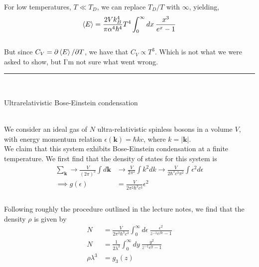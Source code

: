 \documentclass[]{article}
\begin{document}
\begin{enumerate}[1.]
For low temperatures, $T \ll T_D$, we can replace $T_D/T$ with $\infty$, yielding, \\

\begin{equation}
\begin{aligned}
\expval{E} & =  \frac{ 2 V k_B^4}{ \pi \alpha^4 \hbar^4 }  T^4 \int_{0}^{\infty} dx \: \frac{  x^3 }{ e^{ x} - 1 }  \\
%
\end{aligned}
\end{equation} \\

But since $C_V = \partial \expval{E} /\partial T$, we have that $C_V \propto T^3$. Which is not what we were asked to show, but I'm not sure what went wrong. \\






\noindent\rule{15cm}{0.4pt} \\

{\bf \item Ultrarelativistic Bose-Einstein condensation} \\


We consider an ideal gas of $N$ ultra-relativistic spinless bosons in a volume $V$, with energy momentum relation $\epsilon( \bm{k} ) = \hbar k c$, where $k = | \bm{k} |$.  \\

We claim that this system exhibits Bose-Einstein condensation at a finite temperature. We first find that the density of states for this system is \\

\begin{equation}
\begin{aligned}
\sum_{\bm{k}} \to \frac{ V }{ (2\pi)^3 } \int d\bm{k} & \to  \frac{ V }{ 2 \pi^2 } \int k^2 dk \to  \frac{ V }{ 2 \hbar^3 c^3 \pi^2 } \int \epsilon^2 d\epsilon   \\
\implies g( \epsilon ) & =     \frac{ V }{ 2  \pi^2   \hbar^3 c^3  }  \epsilon^2    \\
\end{aligned}
\end{equation} \\

Following roughly the procedure outlined in the lecture notes, we find that the density $\rho$ is given by \\

\begin{equation}
\begin{aligned}
N  & =   \frac{ V }{ 2  \pi^2   \hbar^3 c^3  } \int_{0}^{\infty} d\epsilon \: \frac{ \epsilon^2  }{ z^{-1} e^{\beta \epsilon } - 1 } \\
%
N & =  \frac{ 1 }{ 2  \lambda^3  }   \int_{0}^{\infty} dy  \: \frac{  y^2 }{  z^{-1} e^y - 1   } \\
\rho \lambda^3 & = g_3(z) \\
\end{aligned}
\end{equation} \\



\end{enumerate}
\end{document}
